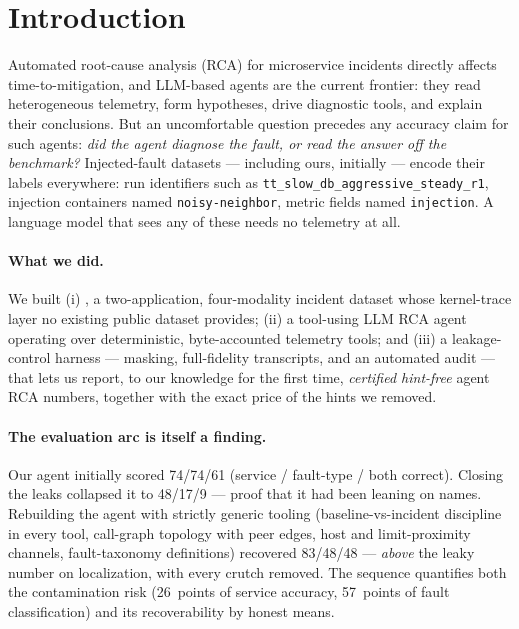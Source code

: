 \section{Introduction}
\label{sec:intro}

Automated root-cause analysis (RCA) for microservice incidents directly affects
time-to-mitigation, and LLM-based agents are the current frontier: they read
heterogeneous telemetry, form hypotheses, drive diagnostic tools, and explain their
conclusions. But an uncomfortable question precedes any accuracy claim for such agents:
\emph{did the agent diagnose the fault, or read the answer off the benchmark?}
Injected-fault datasets --- including ours, initially --- encode their labels
everywhere: run identifiers such as \texttt{tt\_slow\_db\_aggressive\_steady\_r1},
injection containers named \texttt{noisy-neighbor}, metric fields named
\texttt{injection}. A language model that sees any of these needs no telemetry at all.

\paragraph{What we did.} We built (i) \sys, a two-application, four-modality incident
dataset whose kernel-trace layer no existing public dataset provides; (ii) a tool-using
LLM RCA agent operating over deterministic, byte-accounted telemetry tools; and (iii) a
leakage-control harness --- masking, full-fidelity transcripts, and an automated audit
--- that lets us report, to our knowledge for the first time, \emph{certified
hint-free} agent RCA numbers, together with the exact price of the hints we removed.

\paragraph{The evaluation arc is itself a finding.} Our agent initially scored
74/74/61 (service / fault-type / both correct). Closing the leaks collapsed it to
48/17/9 --- proof that it had been leaning on names. Rebuilding the agent with strictly
generic tooling (baseline-vs-incident discipline in every tool, call-graph topology
with peer edges, host and limit-proximity channels, fault-taxonomy definitions)
recovered 83/48/48 --- \emph{above} the leaky number on localization, with every crutch
removed. The sequence quantifies both the contamination risk (26~points of service
accuracy, 57~points of fault classification) and its recoverability by honest means.

